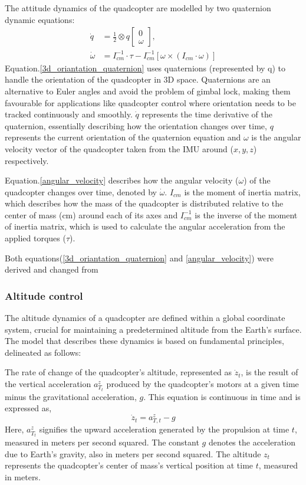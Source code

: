 \documentclass{article}
\begin{document}
The attitude dynamics of the quadcopter are modelled by two quaternion dynamic
equations:
\begin{align}
    \dot{q} &= \frac{1}{2} \otimes q\begin{bmatrix} 0 \\ \omega \end{bmatrix}, \label{3d_oriantation_quaternion}\\
    \dot{\omega} &= I_{cm}^{-1} \cdot \tau - I_{cm}^{-1} \left[ \omega \times (I_{cm} \cdot \omega) \right] \label{angular_velocity}
\end{align}
Equation.\ref{3d_oriantation_quaternion} uses quaternions (represented by q) to
handle the orientation of the quadcopter in 3D space. Quaternions are an
alternative to Euler angles and avoid the problem of gimbal lock, making them
favourable for applications like quadcopter control where orientation needs to
be tracked continuously and smoothly. \(\dot{q}\) represents the time derivative
of the quaternion, essentially describing how the orientation changes over time,
\(q\) represents the current orientation of the quaternion equation and
\(\omega\) is the angular velocity vector of the quadcopter taken from the IMU
around (\(x, y, z\)) respectively.

Equation.\ref{angular_velocity} describes how the angular velocity (\(\omega\))
of the quadcopter changes over time, denoted by \(\dot \omega\). \(I_{cm}\) is
the moment of inertia matrix, which describes how the mass of the quadcopter is
distributed relative to the center of mass (cm) around each of its axes and
\(I_{cm}^{-1}\) is the  inverse of the moment of inertia matrix, which is used
to calculate the angular acceleration from the applied torques (\(\tau\)).

Both equations(\ref{3d_oriantation_quaternion} and \ref{angular_velocity}) were
derived and changed from \cite{QuaternionBasedAttitudeControl}

\subsubsection{Altitude control}\label{Altitude_control} The altitude dynamics
of a quadcopter are defined within a global coordinate system, crucial for
maintaining a predetermined altitude from the Earth's surface. The model that
describes these dynamics is based on fundamental principles, delineated as
follows:

The rate of change of the quadcopter's altitude, represented as \( \dot{z}_t \),
is the result of the vertical acceleration \( a^z_{T_t} \) produced by the
quadcopter's motors at a given time minus the gravitational acceleration, \( g
\). This equation is continuous in time and is expressed as,
\begin{equation}
\dot{z}_t = a^z_{T,t} - g
\end{equation}
\noindent
Here, \( a^z_{T_t} \) signifies the upward acceleration generated by the
propulsion at time \( t \), measured in meters per second squared. The constant
\( g \) denotes the acceleration due to Earth's gravity, also in meters per
second squared. The altitude \( z_t \) represents the quadcopter's center of
mass's vertical position at time \( t \), measured in meters.
\end{document}
